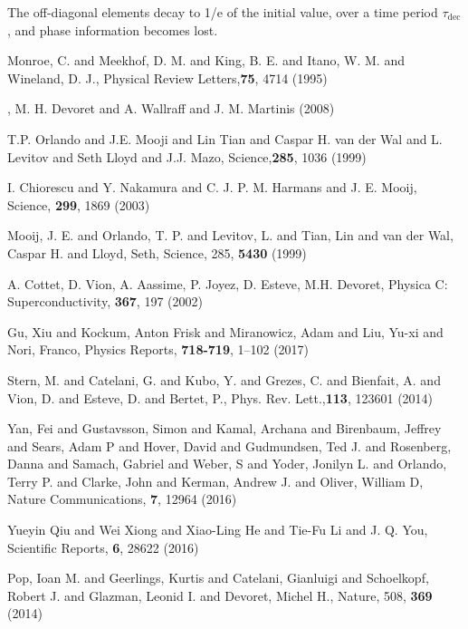 \begin{thebibliography}{99}
  \noindent The off-diagonal  elements decay to 1/e  of the initial value, over  a time period
  $\tau_{\text{dec}}$, and phase information becomes lost.
    
 {Monroe, C.   and Meekhof, D. M.  and  King, B. E. and Itano,  W.  M. and
    Wineland, D.  J.}, {Physical Review Letters},\textbf{75}, 4714 (1995)

, {M. H. Devoret and A. Wallraff and J. M. Martinis} (2008)

 {T.P. Orlando and J.E. Mooji and Lin  Tian and Caspar H. van der Wal and
    L. Levitov and Seth Lloyd and J.J. Mazo}, {Science},\textbf{285}, {1036} (1999)

  {I.  Chiorescu  and Y.   Nakamura  and C.   J.  P.   M.  Harmans  and
    J. E. Mooij}, {Science}, \textbf{299}, 1869 (2003)

 {Mooij, J. E. and Orlando, T. P. and Levitov, L. and Tian, Lin and van der
    Wal, Caspar H.  and Lloyd, Seth}, {Science}, 285, \textbf{5430} (1999)
	
 A.  Cottet,  D. Vion, A.  Aassime, P.  Joyez,  D.  Esteve, M.H.  Devoret,
  Physica C: Superconductivity, \textbf{367}, 197 (2002)

 Gu, Xiu and Kockum, Anton Frisk and Miranowicz, Adam and Liu, Yu-xi and Nori,
  Franco, Physics Reports, \textbf{718-719}, 1--102 (2017)

 Stern, M. and Catelani, G.  and  Kubo, Y. and Grezes, C.  and Bienfait, A.
  and Vion, D.  and Esteve, D.  and Bertet, P., Phys. Rev. Lett.,\textbf{113}, 123601 (2014)

 Yan, Fei and Gustavsson, Simon and Kamal, Archana and Birenbaum, Jeffrey and
  Sears, Adam  P and  Hover, David  and Gudmundsen, Ted  J. and  Rosenberg, Danna  and Samach,
  Gabriel and  Weber, S and  Yoder, Jonilyn L.   and Orlando, Terry  P.  and Clarke,  John and
  Kerman, Andrew J.  and Oliver, William D, Nature Communications, \textbf{7}, 12964 (2016)

 Yueyin  Qiu and Wei  Xiong and Xiao-Ling  He and Tie-Fu  Li and J.   Q. You,
  Scientific Reports, \textbf{6}, 28622 (2016)

 Pop, Ioan  M. and Geerlings, Kurtis and Catelani,  Gianluigi and Schoelkopf,
  Robert J. and Glazman, Leonid I. and Devoret, Michel H., Nature, 508, \textbf{369} (2014)



\end{thebibliography}
